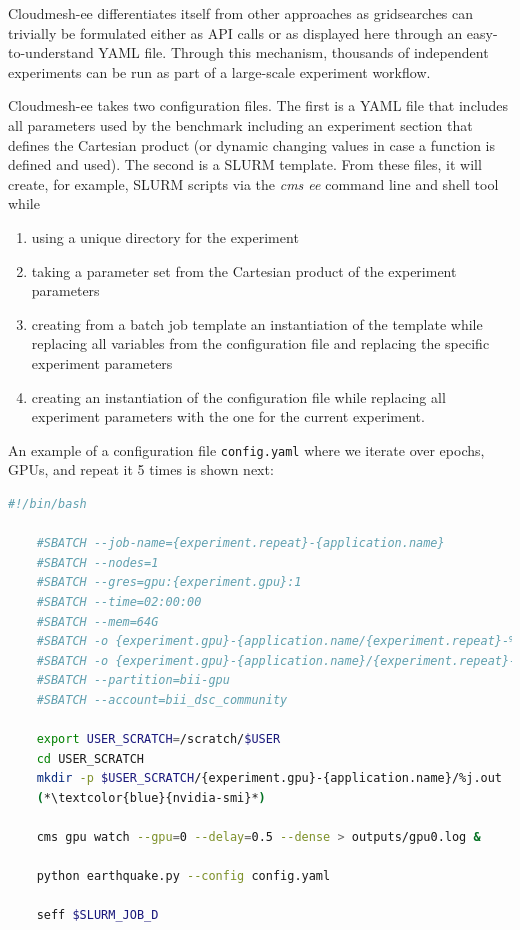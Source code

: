 \documentclass[utf8]{FrontiersinVancouver} %
\begin{document}
Cloudmesh-ee differentiates itself from other approaches as gridsearches can trivially be formulated either as API calls or as displayed here through an easy-to-understand YAML file. Through this mechanism, thousands of independent experiments can be run as part of a large-scale experiment workflow.

Cloudmesh-ee takes two configuration files. The first is a YAML file that includes all parameters used by the benchmark including an experiment section that defines the Cartesian product (or dynamic changing values in case a function is defined and used). The second is a SLURM template. From these files, it will create, for example, SLURM scripts via the {\em cms ee} command line and shell tool while

\begin{enumerate}
  \item using a unique directory for the experiment
  \item taking a parameter set from the Cartesian product of the experiment parameters
  \item creating from a batch job template an instantiation of the template while replacing all variables from the configuration file    and replacing the specific experiment parameters
  \item creating an instantiation of the configuration file while replacing all experiment parameters with the one for the current experiment.
\end{enumerate}

An example of a configuration file \verb|config.yaml| where we iterate over epochs, GPUs, and repeat it 5 times is shown next:

\begin{lstlisting}[language=sh]
    #!/bin/bash

    #SBATCH --job-name={experiment.repeat}-{application.name}
    #SBATCH --nodes=1
    #SBATCH --gres=gpu:{experiment.gpu}:1
    #SBATCH --time=02:00:00
    #SBATCH --mem=64G
    #SBATCH -o {experiment.gpu}-{application.name/{experiment.repeat}-%j.out
    #SBATCH -o {experiment.gpu}-{application.name}/{experiment.repeat}-%j.err
    #SBATCH --partition=bii-gpu
    #SBATCH --account=bii_dsc_community

    export USER_SCRATCH=/scratch/$USER
    cd USER_SCRATCH
    mkdir -p $USER_SCRATCH/{experiment.gpu}-{application.name}/%j.out
    (*\textcolor{blue}{nvidia-smi}*)

    cms gpu watch --gpu=0 --delay=0.5 --dense > outputs/gpu0.log &

    python earthquake.py --config config.yaml

    seff $SLURM_JOB_D
\end{lstlisting}
\end{document}
